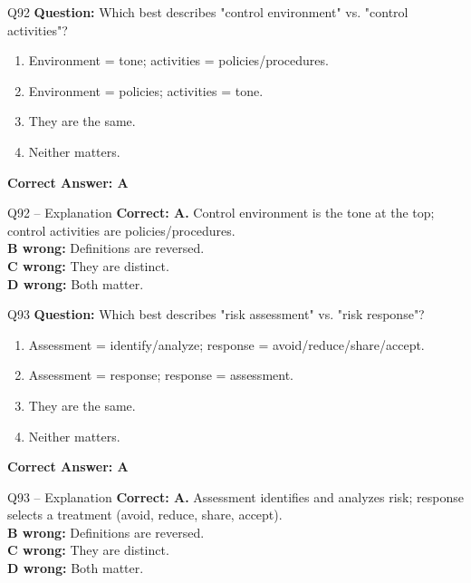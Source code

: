 \documentclass[aspectratio=169,10pt]{beamer}
\begin{document}
	\begin{frame}[t]{Q92}
		\small
		\textbf{Question:} Which best describes "control environment" vs. "control activities"?
		\begin{enumerate}[label=\Alph*.,itemsep=1pt,topsep=2pt]
			\item Environment = tone; activities = policies/procedures.
			\item Environment = policies; activities = tone.
			\item They are the same.
			\item Neither matters.
		\end{enumerate}
		\vspace{4pt}
		\textbf{Correct Answer: A}
	\end{frame}
	
	\begin{frame}[t]{Q92 -- Explanation}
		\small
		\textbf{Correct: A.} Control environment is the tone at the top; control activities are policies/procedures. \\[4pt]
		\textbf{B wrong:} Definitions are reversed. \\[2pt]
		\textbf{C wrong:} They are distinct. \\[2pt]
		\textbf{D wrong:} Both matter.
	\end{frame}
	
	\begin{frame}[t]{Q93}
		\small
		\textbf{Question:} Which best describes "risk assessment" vs. "risk response"?
		\begin{enumerate}[label=\Alph*.,itemsep=1pt,topsep=2pt]
			\item Assessment = identify/analyze; response = avoid/reduce/share/accept.
			\item Assessment = response; response = assessment.
			\item They are the same.
			\item Neither matters.
		\end{enumerate}
		\vspace{4pt}
		\textbf{Correct Answer: A}
	\end{frame}
	
	\begin{frame}[t]{Q93 -- Explanation}
		\small
		\textbf{Correct: A.} Assessment identifies and analyzes risk; response selects a treatment (avoid, reduce, share, accept). \\[4pt]
		\textbf{B wrong:} Definitions are reversed. \\[2pt]
		\textbf{C wrong:} They are distinct. \\[2pt]
		\textbf{D wrong:} Both matter.
	\end{frame}
	
\end{document}
